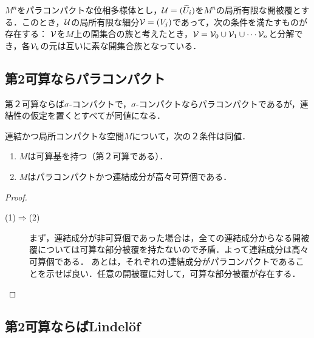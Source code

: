 \documentclass[uplatex,dvipdfmx]{jsreport}
\begin{document}
\begin{theorem}[パラコンパクト多様体の開被覆]\label{thm-open-cover-of-paracompact-locally-Euclidean-space}
    $M^n$をパラコンパクトな位相多様体とし，$\mathcal{U}=(\widetilde{U}_i)$を$M^n$の局所有限な開被覆とする．このとき，$\mathcal{U}$の局所有限な細分$\mathcal{V}=(V_j)$であって，次の条件を満たすものが存在する：
    $\mathcal{V}$を$M$上の開集合の族と考えたとき，$\mathcal{V}=\mathcal{V}_0\cup\mathcal{V}_1\cup\cdots\mathcal{V}_n$と分解でき，各$\mathcal{V}_k$の元は互いに素な開集合族となっている．
\end{theorem}

\subsection{第2可算ならパラコンパクト}

\begin{tcolorbox}[colframe=ForestGreen, colback=ForestGreen!10!white,breakable,colbacktitle=ForestGreen!40!white,coltitle=black,fonttitle=\bfseries\sffamily,
title=]
    第２可算ならば$\sigma$-コンパクトで，$\sigma$-コンパクトならパラコンパクトであるが，連結性の仮定を置くとすべてが同値になる．
\end{tcolorbox}

\begin{corollary}
    連結かつ局所コンパクトな空間$M$について，次の２条件は同値．
    \begin{enumerate}
        \item $M$は可算基を持つ（第２可算である）．
        \item $M$はパラコンパクトかつ連結成分が高々可算個である．
    \end{enumerate}
\end{corollary}
\begin{proof}\mbox{}
    \begin{description}
        \item[(1)$\Rightarrow$(2)] まず，連結成分が非可算個であった場合は，全ての連結成分からなる開被覆については可算な部分被覆を持たないので矛盾．よって連結成分は高々可算個である．
        あとは，それぞれの連結成分がパラコンパクトであることを示せば良い．任意の開被覆に対して，可算な部分被覆が存在する．
    \end{description}
\end{proof}

\subsection{第2可算ならばLindelöf}
\end{document}
